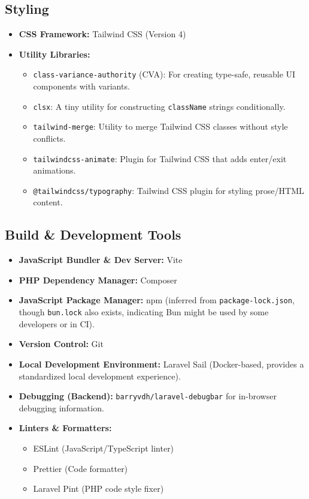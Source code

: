 \documentclass[12pt,a4paper]{article}
\begin{document}
\subsection{Styling}
\begin{itemize}
    \item \textbf{CSS Framework:} Tailwind CSS (Version 4)
    \item \textbf{Utility Libraries:}
    \begin{itemize}
        \item \texttt{class-variance-authority} (CVA): For creating type-safe, reusable UI components with variants.
        \item \texttt{clsx}: A tiny utility for constructing \texttt{className} strings conditionally.
        \item \texttt{tailwind-merge}: Utility to merge Tailwind CSS classes without style conflicts.
        \item \texttt{tailwindcss-animate}: Plugin for Tailwind CSS that adds enter/exit animations.
        \item \texttt{@tailwindcss/typography}: Tailwind CSS plugin for styling prose/HTML content.
    \end{itemize}
\end{itemize}

\subsection{Build \& Development Tools}
\begin{itemize}
    \item \textbf{JavaScript Bundler \& Dev Server:} Vite
    \item \textbf{PHP Dependency Manager:} Composer
    \item \textbf{JavaScript Package Manager:} npm (inferred from \texttt{package-lock.json}, though \texttt{bun.lock} also exists, indicating Bun might be used by some developers or in CI).
    \item \textbf{Version Control:} Git
    \item \textbf{Local Development Environment:} Laravel Sail (Docker-based, provides a standardized local development experience).
    \item \textbf{Debugging (Backend):} \texttt{barryvdh/laravel-debugbar} for in-browser debugging information.
    \item \textbf{Linters \& Formatters:}
    \begin{itemize}
        \item ESLint (JavaScript/TypeScript linter)
        \item Prettier (Code formatter)
        \item Laravel Pint (PHP code style fixer)
    \end{itemize}
\end{itemize}
\end{document}
